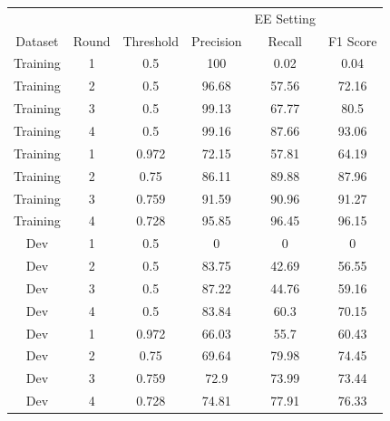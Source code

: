 \documentclass{report}
\theoremstyle{definition}
\theoremstyle{remark}
\begin{document}
\begin{table}[H]
    \vspace{0.5cm}\begin{tabular}{cccccc}
    &&&&EE Setting & \\
    Dataset & Round    & Threshold & Precision & Recall & F1 Score \\
    \hline
    Training & 1 & 0.5&100&0.02&0.04 \\
    Training & 2 & 0.5&96.68&57.56&72.16 \\
    Training & 3 & 0.5&99.13&67.77&80.5 \\
    Training & 4 & 0.5&99.16&87.66&93.06 \\
    \hline
    Training & 1 & 0.972&72.15&57.81&64.19 \\
    Training & 2 & 0.75&86.11&89.88&87.96 \\
    Training & 3 & 0.759&91.59&90.96&91.27 \\
    Training & 4 & 0.728 &95.85&96.45&96.15\\
    \hline 
    Dev & 1 & 0.5&0&0&0 \\
    Dev & 2 & 0.5&83.75&42.69&56.55 \\
    Dev & 3 & 0.5&87.22&44.76&59.16 \\
    Dev & 4 & 0.5&83.84&60.3&70.15 \\
    \hline
    Dev & 1 & 0.972 &66.03&55.7&60.43\\
    Dev & 2 & 0.75  &69.64&79.98&74.45\\
    Dev & 3 & 0.759 &72.9&73.99&73.44\\
    Dev & 4 & 0.728 &74.81&77.91&76.33\\
    \end{tabular}
    

\end{table}
\end{document}
